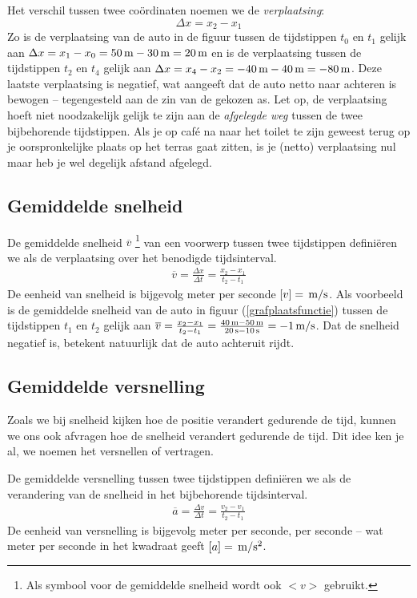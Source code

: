 \documentclass{ximera}
\begin{document}
	Het verschil tussen twee co\"ordinaten noemen we de \emph{verplaatsing}:
	\[
	\Delta x = x_2-x_1
	\]
	Zo is de verplaatsing van de auto in de figuur tussen de tijdstippen $t_0$ en $t_1$ gelijk aan $\Delta x = x_1-x_0=50\rm\,m-30\rm\,m=20\rm\,m$ en is de verplaatsing tussen de tijdstippen $t_2$ en $t_4$ gelijk aan $\Delta x=x_4-x_2=-40\rm\,m-40\rm\,m=-80\rm\,m$. Deze laatste verplaatsing is negatief, wat aangeeft dat de auto netto naar achteren is bewogen -- tegengesteld aan de zin van de gekozen as.
	Let op, de verplaatsing hoeft niet noodzakelijk gelijk te zijn aan de \emph{afgelegde weg} tussen de twee bijbehorende tijdstippen. Als je op caf\'e na naar het toilet te zijn geweest terug op je oorspronkelijke plaats op het terras gaat zitten, is je (netto) verplaatsing nul maar heb je wel degelijk afstand afgelegd.
	
	\subsection{Gemiddelde snelheid}
	
	De gemiddelde snelheid $\overline{v}$ \footnote{Als symbool voor de gemiddelde snelheid wordt ook $<v>$ gebruikt.} van een voorwerp tussen twee tijdstippen defini\"eren we als de verplaatsing over het benodigde tijdsinterval.
	\begin{eqnarray*}
	\overline{v}=\frac{\Delta x}{\Delta t}=\frac{x_2-x_1}{t_2-t_1}
	\end{eqnarray*}
	De eenheid van snelheid is bijgevolg meter per seconde $[v]=\rm\,m/s$. Als voorbeeld is de gemiddelde snelheid van de auto in figuur (\ref{grafplaatsfunctie}) tussen de tijdstippen $t_1$ en $t_2$ gelijk aan $\overline{v}=\frac{x_2-x_1}{t_2-t_1}=\frac{40\rm\,m-50\rm\,m}{20\rm\,s-10\rm\,s}=-1\rm\,m/s$. Dat de snelheid negatief is, betekent natuurlijk dat de auto achteruit rijdt.
	
	\subsection{Gemiddelde versnelling}
	
	Zoals we bij snelheid kijken hoe de positie verandert gedurende de tijd, kunnen we ons ook afvragen hoe de snelheid verandert gedurende de tijd. Dit idee ken je al, we noemen het versnellen of vertragen.
	
	De gemiddelde versnelling tussen twee tijdstippen defini\"eren we als de verandering van de snelheid in het bijbehorende tijdsinterval.
	\begin{eqnarray*}
	\overline{a}=\frac{\Delta v}{\Delta t}=\frac{v_2-v_1}{t_2-t_1}
	\end{eqnarray*}
	De eenheid van versnelling is bijgevolg meter per seconde, per seconde -- wat meter per seconde in het kwadraat geeft $[a]=\rm\,m/s^2$.
	
\end{document}
